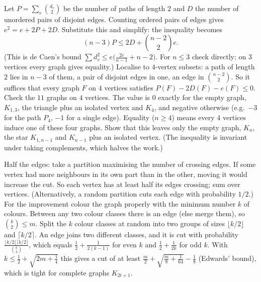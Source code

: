 \documentclass[11pt,a4paper]{article}
\begin{document}
Let \(P=\sum_v\binom{d_v}2\) be the number of paths of length \(2\) and \(D\) the number of unordered pairs of disjoint edges. Counting ordered pairs of edges gives \(e^2=e+2P+2D\). Substitute this and simplify: the inequality becomes
\[(n-3)P\le2D+\binom{n-2}{2}e.\]
(This is de Caen's bound \(\sum d_v^2\le e\bigl(\frac{2e}{n-1}+n-2\bigr)\). For \(n\le3\) check directly; on \(3\) vertices every graph gives equality.)
Localise to \(4\)-vertex subsets: a path of length \(2\) lies in \(n-3\) of them, a pair of disjoint edges in one, an edge in \(\binom{n-2}2\). So it suffices that every graph \(F\) on \(4\) vertices satisfies \(P(F)-2D(F)-e(F)\le0\).
Check the \(11\) graphs on \(4\) vertices. The value is \(0\) exactly for the empty graph, \(K_{1,3}\), the triangle plus an isolated vertex and \(K_4\), and negative otherwise (e.g.\ \(-3\) for the path \(P_4\), \(-1\) for a single edge).
Equality (\(n\ge4\)) means every \(4\) vertices induce one of these four graphs. Show that this leaves only the empty graph, \(K_n\), the star \(K_{1,n-1}\) and \(K_{n-1}\) plus an isolated vertex. (The inequality is invariant under taking complements, which halves the work.)

Half the edges: take a partition maximising the number of crossing edges. If some vertex had more neighbours in its own part than in the other, moving it would increase the cut. So each vertex has at least half its edges crossing; sum over vertices. (Alternatively, a random partition cuts each edge with probability \(1/2\).)
For the improvement colour the graph properly with the minimum number \(k\) of colours. Between any two colour classes there is an edge (else merge them), so \(\binom k2\le m\).
Split the \(k\) colour classes at random into two groups of sizes \(\lfloor k/2\rfloor\) and \(\lceil k/2\rceil\). An edge joins two different classes, and it is cut with probability \(\frac{\lfloor k/2\rfloor\lceil k/2\rceil}{\binom k2}\), which equals \(\frac12+\frac1{2(k-1)}\) for even \(k\) and \(\frac12+\frac1{2k}\) for odd \(k\).
With \(k\le\frac12+\sqrt{2m+\frac14}\) this gives a cut of at least \(\frac m2+\sqrt{\frac m8+\frac1{64}}-\frac18\) (Edwards' bound), which is tight for complete graphs \(K_{2t+1}\).
\end{document}
